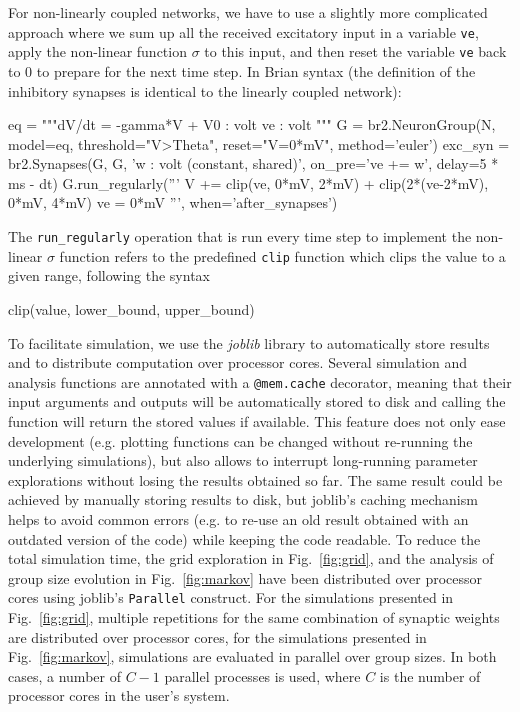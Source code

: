 \documentclass[10pt,a4paper,onecolumn]{article}
\begin{document}
For non-linearly coupled networks, we have to use a slightly more complicated approach where we sum up all the received excitatory input in a variable \verb|ve|, apply the non-linear function $\sigma$ to this input, and then reset the variable \verb|ve| back to 0 to prepare for the next time step. In Brian syntax (the definition of the inhibitory synapses is identical to the linearly coupled network):
\begin{code}
eq = """dV/dt = -gamma*V + V0 : volt
        ve : volt
     """
G = br2.NeuronGroup(N, model=eq, threshold="V>Theta",
                    reset="V=0*mV", method='euler')
exc_syn = br2.Synapses(G, G, 'w : volt (constant, shared)',
                       on_pre='ve += w', delay=5 * ms - dt)
G.run_regularly('''
                V += clip(ve, 0*mV, 2*mV) + clip(2*(ve-2*mV), 0*mV, 4*mV)
                ve = 0*mV
                ''', when='after_synapses')
\end{code}
The \verb|run_regularly| operation that is run every time step to implement the non-linear $\sigma$ function refers to the predefined \verb|clip| function which clips the value to a given range, following the syntax
\begin{code}
clip(value, lower_bound, upper_bound)
\end{code}
To facilitate simulation, we use the \emph{joblib} library to automatically store results and to distribute computation over processor cores. Several simulation and analysis functions are annotated with a \verb|@mem.cache| decorator, meaning that their input arguments and outputs will be automatically stored to disk and calling the function will return the stored values if available. This feature does not only ease development (e.g. plotting functions can be changed without re-running the underlying simulations), but also allows to interrupt long-running parameter explorations without losing the results obtained so far. The same result could be achieved by manually storing results to disk, but joblib's caching mechanism helps to avoid common errors (e.g. to re-use an old result obtained with an outdated version of the code) while keeping the code readable. To reduce the total simulation time, the grid exploration in Fig.~\ref{fig:grid}, and the analysis of group size evolution in Fig.~\ref{fig:markov} have been distributed over processor cores using joblib's \verb|Parallel| construct. For the simulations presented in Fig.~\ref{fig:grid}, multiple repetitions for the same combination of synaptic weights are distributed over processor cores, for the simulations presented in Fig.~\ref{fig:markov}, simulations are evaluated in parallel over group sizes. In both cases, a number of $C-1$ parallel processes is used, where $C$ is the number of processor cores in the user's system.
\end{document}
